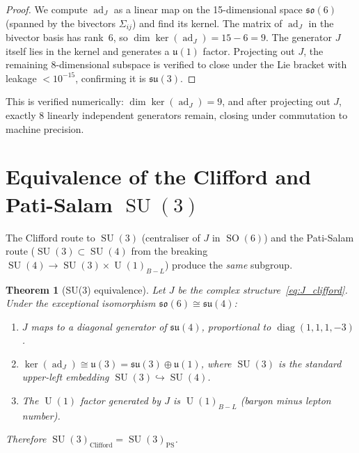 \documentclass[12pt,a4paper]{article}
\newtheorem{theorem}{Theorem}[section]
\theoremstyle{definition}
\newcommand{\SO}{\operatorname{SO}}
\newcommand{\SU}{\operatorname{SU}}
\newcommand{\U}{\operatorname{U}}
\newcommand{\ad}{\operatorname{ad}}
\newcommand{\diag}{\operatorname{diag}}
\begin{document}
\begin{proof}
We compute $\ad_J$ as a linear map on the 15-dimensional space $\mathfrak{so}(6)$ (spanned by the bivectors $\Sigma_{ij}$) and find its kernel.
The matrix of $\ad_J$ in the bivector basis has rank~6, so $\dim \ker(\ad_J) = 15 - 6 = 9$.
The generator $J$ itself lies in the kernel and generates a $\mathfrak{u}(1)$ factor.
Projecting out $J$, the remaining 8-dimensional subspace is verified to close under the Lie bracket with leakage $< 10^{-15}$, confirming it is $\mathfrak{su}(3)$.
\end{proof}

This is verified numerically: $\dim \ker(\ad_J) = 9$, and after projecting out $J$, exactly 8 linearly independent generators remain, closing under commutation to machine precision.


\section{Equivalence of the Clifford and Pati-Salam \texorpdfstring{$\SU(3)$}{SU(3)}}
\label{sec:equivalence}

The Clifford route to $\SU(3)$ (centraliser of $J$ in $\SO(6)$) and the Pati-Salam route ($\SU(3) \subset \SU(4)$ from the breaking $\SU(4) \to \SU(3) \times \U(1)_{B-L}$) produce the \emph{same} subgroup.

\begin{theorem}[SU(3) equivalence]
\label{thm:su3_equiv}
Let $J$ be the complex structure~\eqref{eq:J_clifford}.
Under the exceptional isomorphism $\mathfrak{so}(6) \cong \mathfrak{su}(4)$:
\begin{enumerate}[nosep]
\item $J$ maps to a diagonal generator of $\mathfrak{su}(4)$, proportional to $\diag(1,1,1,-3)$.
\item $\ker(\ad_J) \cong \mathfrak{u}(3) = \mathfrak{su}(3) \oplus \mathfrak{u}(1)$, where $\SU(3)$ is the standard upper-left embedding $\SU(3) \hookrightarrow \SU(4)$.
\item The $\U(1)$ factor generated by $J$ is $\U(1)_{B-L}$ (baryon minus lepton number).
\end{enumerate}
Therefore $\SU(3)_{\mathrm{Clifford}} = \SU(3)_{\mathrm{PS}}$.
\end{theorem}
\end{document}
